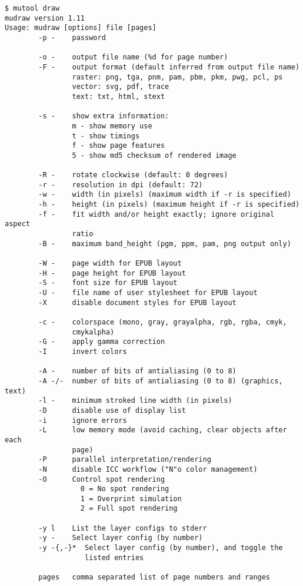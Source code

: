 \documentclass[oneside]{book}
\begin{document}
\begin{lstlisting}
$ mutool draw
mudraw version 1.11
Usage: mudraw [options] file [pages]
        -p -    password

        -o -    output file name (%d for page number)
        -F -    output format (default inferred from output file name)
                raster: png, tga, pnm, pam, pbm, pkm, pwg, pcl, ps
                vector: svg, pdf, trace
                text: txt, html, stext

        -s -    show extra information:
                m - show memory use
                t - show timings
                f - show page features
                5 - show md5 checksum of rendered image

        -R -    rotate clockwise (default: 0 degrees)
        -r -    resolution in dpi (default: 72)
        -w -    width (in pixels) (maximum width if -r is specified)
        -h -    height (in pixels) (maximum height if -r is specified)
        -f -    fit width and/or height exactly; ignore original aspect
                ratio
        -B -    maximum band_height (pgm, ppm, pam, png output only)

        -W -    page width for EPUB layout
        -H -    page height for EPUB layout
        -S -    font size for EPUB layout
        -U -    file name of user stylesheet for EPUB layout
        -X      disable document styles for EPUB layout

        -c -    colorspace (mono, gray, grayalpha, rgb, rgba, cmyk,
                cmykalpha)
        -G -    apply gamma correction
        -I      invert colors

        -A -    number of bits of antialiasing (0 to 8)
        -A -/-  number of bits of antialiasing (0 to 8) (graphics, text)
        -l -    minimum stroked line width (in pixels)
        -D      disable use of display list
        -i      ignore errors
        -L      low memory mode (avoid caching, clear objects after each
                page)
        -P      parallel interpretation/rendering
		-N      disable ICC workflow ("N"o color management)
		-O      Control spot rendering
		          0 = No spot rendering
		          1 = Overprint simulation
		          2 = Full spot rendering

        -y l    List the layer configs to stderr
        -y -    Select layer config (by number)
        -y -{,-}*  Select layer config (by number), and toggle the
                   listed entries

        pages   comma separated list of page numbers and ranges
\end{lstlisting}
\end{document}
